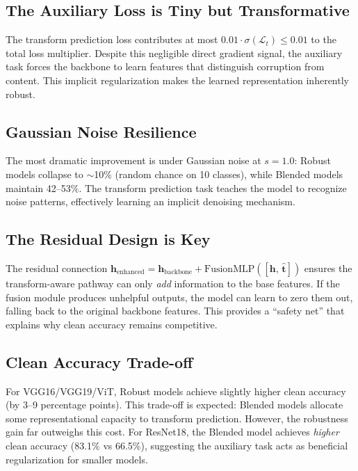 \documentclass[11pt,a4paper]{article}
\begin{document}
\subsection{The Auxiliary Loss is Tiny but Transformative}

The transform prediction loss contributes at most $0.01 \cdot \sigma(\mathcal{L}_t) \leq 0.01$ to the total loss multiplier. Despite this negligible direct gradient signal, the auxiliary task forces the backbone to learn features that distinguish corruption from content. This implicit regularization makes the learned representation inherently robust.

\subsection{Gaussian Noise Resilience}

The most dramatic improvement is under Gaussian noise at $s = 1.0$: Robust models collapse to $\sim$10\% (random chance on 10 classes), while Blended models maintain 42--53\%. The transform prediction task teaches the model to recognize noise patterns, effectively learning an implicit denoising mechanism.

\subsection{The Residual Design is Key}

The residual connection $\mathbf{h}_{\text{enhanced}} = \mathbf{h}_{\text{backbone}} + \text{FusionMLP}([\mathbf{h},\, \hat{\mathbf{t}}])$ ensures the transform-aware pathway can only \emph{add} information to the base features. If the fusion module produces unhelpful outputs, the model can learn to zero them out, falling back to the original backbone features. This provides a ``safety net'' that explains why clean accuracy remains competitive.

\subsection{Clean Accuracy Trade-off}

For VGG16/VGG19/ViT, Robust models achieve slightly higher clean accuracy (by 3--9 percentage points). This trade-off is expected: Blended models allocate some representational capacity to transform prediction. However, the robustness gain far outweighs this cost. For ResNet18, the Blended model achieves \emph{higher} clean accuracy (83.1\% vs 66.5\%), suggesting the auxiliary task acts as beneficial regularization for smaller models.
\end{document}
